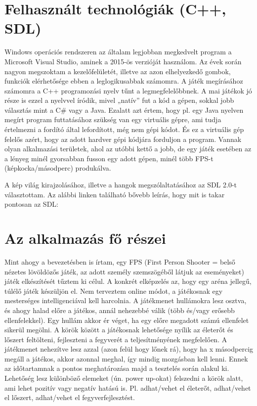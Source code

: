 \label{Chap:komponensek}

\section{Felhasznált technológiák (C++, SDL)}

Windows operációs rendszeren az általam legjobban megkedvelt program a Microsoft Visual Studio, aminek a 2015-ös verzióját használom. Az évek során nagyon megszoktam a kezelőfelületét, illetve az azon elhelyezkedő gombok, funkciók elérhetősége ebben a leglogikusabbak számomra. A játék megírásához számomra a C++ programozási nyelv tűnt a legmegfelelőbbnek. A mai játékok jó része is ezzel a nyelvvel íródik, mivel „natív” fut a kód a gépen, sokkal jobb választás mint a C\# vagy a Java. Ezalatt azt értem, hogy pl. egy Java nyelven megírt program futtatásához szükség van egy virtuális gépre, ami tudja értelmezni a fordító által lefordított, még nem gépi kódot. És ez a virtuális gép felelős azért, hogy az adott hardver gépi kódjára forduljon a program. Vannak olyan alkalmazási területek, ahol az utóbbi kettő a jobb, de egy játék esetében az a lényeg minél gyorsabban fusson egy adott gépen, minél több FPS-t (képkocka/másodperc) produkálva.

A kép világ kirajzolásához, illetve a hangok megszólaltatásához az SDL 2.0-t választottam. Az alábbi linken található bővebb leírás, hogy mit is takar pontosan az SDL:


\section{Az alkalmazás fő részei}

Mint ahogy a bevezetésben is írtam, egy FPS (First Person Shooter = belső nézetes lövöldözős játék, az adott személy szemszögéből látjuk az eseményeket) játék elkészítését tűztem ki célul. A konkrét elképzelés az, hogy egy aréna jellegű, túlélő játék készüljön el. Nem terveztem online módot, a játékosnak egy mesterséges intelligenciával kell harcolnia. A játékmenet hullámokra lesz osztva, és ahogy halad előre a játékos, annál nehezebbé válik (több és/vagy erősebb ellenfelekkel). Egy hullám akkor ér véget, ha egy előre megadott számú ellenfelet sikerül megölni. A körök között a játékosnak lehetősége nyílik az életerőt és lőszert feltölteni, fejleszteni a fegyverét a teljesítményének megfelelően. A játékmenet nehezítve lesz azzal (azon felül hogy lőnek rá), hogy ha x másodpercig megáll a játékos, akkor azonnal meghal, így mindig mozgásban kell lenni. Ennek az időtartamnak a pontos meghatározása majd a tesztelés során alakul ki. Lehetőség lesz különböző elemeket (ún. power up-okat) felszedni a körök alatt, ami lehet pozitív vagy negatív hatású is. Pl. adhat/vehet el életerőt, adhat/vehet el lőszert, adhat/vehet el fegyverfejlesztést.

